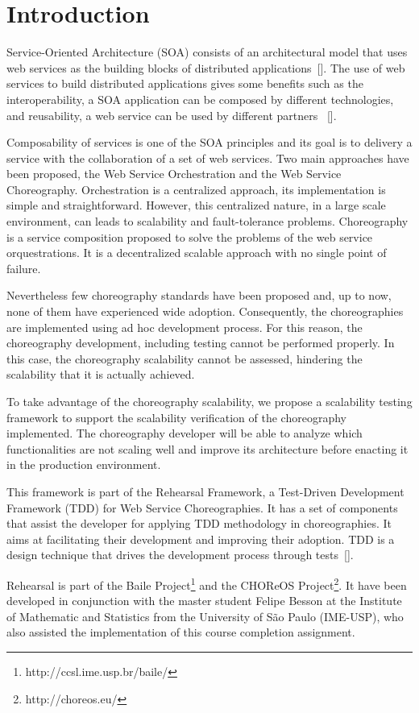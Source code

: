 \section{Introduction}
Service-Oriented Architecture (SOA) consists of an architectural model that uses web services as the building blocks of distributed applications~[\citet{Hew09}]. The use of web services to build distributed applications gives some benefits such as the interoperability, a SOA application can be composed by different technologies, and reusability, a web service can be used by different partners ~[\citet{Bean10}].

Composability of services is one of the SOA principles and its goal is to delivery a service with the collaboration of a set of web services. Two main approaches have been proposed, the Web Service Orchestration and the Web Service Choreography. Orchestration is a centralized approach, its implementation is simple and straightforward. However, this centralized nature, in a large scale environment, can leads to scalability and fault-tolerance problems. Choreography is a service composition proposed to solve the problems of the web service orquestrations. It is a decentralized scalable approach with no single point of failure. 

Nevertheless few choreography standards have been proposed and, up to now, none of them have experienced wide adoption. Consequently, the choreographies are implemented using ad hoc development process. For this reason, the choreography development, including testing cannot be performed properly. In this case, the choreography scalability cannot be assessed, hindering the scalability that it is actually achieved.

To take advantage of the choreography scalability, we propose a scalability testing framework to support the scalability verification of the choreography implemented. The choreography developer will be able to analyze which functionalities are not scaling well and improve its architecture before enacting it in the production environment.

This framework is part of the Rehearsal Framework, a Test-Driven Development Framework (TDD)  for Web Service Choreographies. It has a set of components that assist the developer for applying TDD methodology in choreographies. It aims at facilitating their development and improving their adoption. TDD is a design technique that drives the development process through tests~[\citet{Beck02}].  

Rehearsal is part of the Baile Project\footnote{http://ccsl.ime.usp.br/baile/} and the CHOReOS Project\footnote{http://choreos.eu/}. It have been developed in conjunction with the master student Felipe Besson at the Institute of Mathematic and Statistics from the University of S\~ao Paulo (IME-USP), who also assisted the implementation of this course completion assignment.


